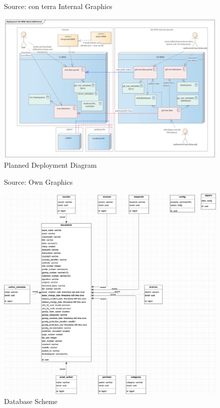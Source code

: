 \documentclass[11pt, titlepage, a4paper]{article}
\newcommand{\source}[1]{\caption*{Source: {#1}} }
\begin{document}
\begin{appendices}
    \begin{figure}[H]
        \caption{Planned Deployment Diagram}
        \source{con terra Internal Graphics \cite{conterraGDNRWMetaDAMPort2024}}
        \label{fig:deployment}
        \includegraphics[width=16cm]{deployment_.png}
        \centering
    \end{figure}
    \begin{figure}[H]
        \caption{Database Scheme}
        \source{Own Graphics}
        \label{fig:db}
        \includegraphics[width=16cm]{db3.png}
        \centering
    \end{figure}
    \begin{figure}[H]

\end{figure}
\end{appendices}
\end{document}
